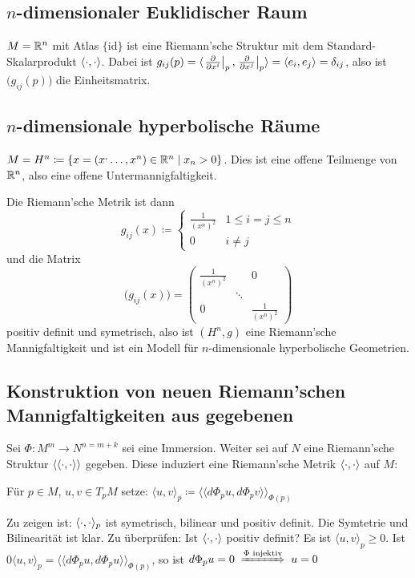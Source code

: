 \documentclass[a4paper,twoside,DIV15,BCOR12mm]{scrbook}
\renewcommand{\da}{\coloneqq}
\begin{document}
\subsection{$n$-dimensionaler Euklidischer Raum}
$M=\mathbb{R}^n$ mit Atlas $\{\text{id}\}$ ist eine Riemann’sche Struktur mit dem Standard-Skalarprodukt $\langle\cdot,\cdot\rangle$. Dabei ist $g_{ij}(p) = \langle \left.\frac{\partial}{\partial x^{i}}\right|_p, \left.\frac{\partial}{\partial x^{j}}\right|_p \rangle = \langle e_i, e_j \rangle = \delta_{ij}$, also ist $\big(g_{ij}(p)\big)$ die Einheitsmatrix.

\subsection{$n$-dimensionale hyperbolische Räume}
$M = H^n \da \{ x = (x^,\ldots, x^n) \in \MdR^n \mid x_n > 0 \}$. Dies ist eine offene Teilmenge von $\mathbb{R}^n$, also eine offene Untermannigfaltigkeit.

Die Riemann’sche Metrik ist dann 
\[
g_{ij}(x) \da 
\begin{cases}
\frac 1 {(x^n)^2} & 1\le i = j \le n \\
0 & i \ne j
\end{cases}
\]
und die Matrix 
\[
\big(g_{ij}(x)\big) = 
\begin{pmatrix}
\frac 1 {(x^n)^2}& & 0 \\
& \ddots & \\
0 & & \frac 1 {(x^n)^2}
\end{pmatrix}
\]
positiv definit und symetrisch, also ist $(H^n, g)$ eine Riemann’sche Mannigfaltigkeit und ist ein Modell für $n$-dimensionale hyperbolische Geometrien.

\subsection{Konstruktion von neuen Riemann’schen Mannigfaltigkeiten aus gegebenen}

Sei $\Phi: M^m \to N^{n=m+k}$ sei eine Immersion. Weiter sei auf $N$ eine Riemann’sche Struktur $\langle\langle\cdot,\cdot\rangle\rangle$ gegeben. Diese induziert eine Riemann’sche Metrik $\langle\cdot,\cdot\rangle$ auf $M$:

Für $p\in M$, $u,v\in T_pM$ setze: $\langle u,v\rangle_p \da \langle\langle d\Phi_pu, d\Phi_p v \rangle\rangle_{\Phi(p)}$

Zu zeigen ist: $\langle\cdot,\cdot\rangle_p$ ist symetrisch, bilinear und positiv definit. Die Symtetrie und Bilinearität ist klar. Zu überprüfen: Ist $\langle\cdot,\cdot\rangle$ positiv definit? Es ist $\langle u,v\rangle_p \ge 0$. Ist $0 \langle u,v\rangle_p = \langle\langle d\Phi_pu,d\Phi_pu\rangle\rangle_{\Phi(p)}$, so ist $d\Phi_pu = 0 \folgtnach{$\Phi$ injektiv} u = 0$
\end{document}
